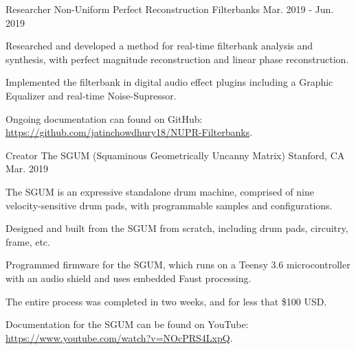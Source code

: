 \begin{cventries}
    \cventry
    {Researcher} %
    {Non-Uniform Perfect Reconstruction Filterbanks} %
    {} %
    {Mar. 2019 - Jun. 2019} %
    {
      \begin{cvitems} %
        \item {Researched and developed a method for real-time filterbank analysis and synthesis, with perfect magnitude reconstruction and linear phase reconstruction.}
        \item {Implemented the filterbank in digital audio effect plugins including a Graphic Equalizer and real-time Noise-Supressor.}
        \item {Ongoing documentation can found on GitHub: \url{https://github.com/jatinchowdhury18/NUPR-Filterbanks}.}
      \end{cvitems}
    }

    \cventry
    {Creator} %
    {The SGUM (Squaminous Geometrically Uncanny Matrix)} %
    {Stanford, CA} %
    {Mar. 2019} %
    {
      \begin{cvitems} %
        \item {The SGUM is an expressive standalone drum machine, comprised of nine velocity-sensitive drum pads, with programmable samples and configurations.}
        \item {Designed and built from the SGUM from scratch, including drum pads, circuitry, frame, etc.}
        \item {Programmed firmware for the SGUM, which runs on a Teensy 3.6 microcontroller with an audio shield and uses embedded Faust processing.}
        \item {The entire process was completed in two weeks, and for less that \$100 USD.}
        \item {Documentation for the SGUM can be found on YouTube: \url{https://www.youtube.com/watch?v=NOcPRS4LxpQ}.}
      \end{cvitems}
    }


\end{cventries}
